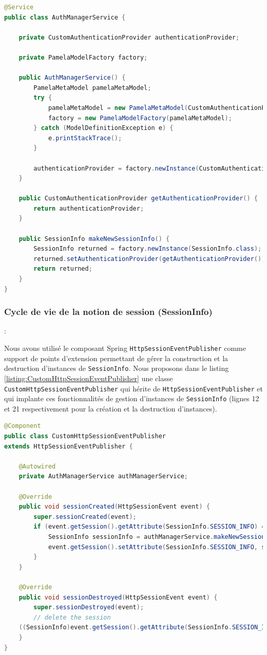 \begin{lstlisting}[language=Java,basicstyle=\ttfamily\footnotesize, caption=Mise en oeuvre du service d'authentification : \texttt{AuthManagerService.java},label=listing:AuthManagerService]
@Service
public class AuthManagerService {

	private CustomAuthenticationProvider authenticationProvider;

	private PamelaModelFactory factory;

	public AuthManagerService() {
		PamelaMetaModel pamelaMetaModel;
		try {
			pamelaMetaModel = new PamelaMetaModel(CustomAuthenticationProvider.class);
			factory = new PamelaModelFactory(pamelaMetaModel);
		} catch (ModelDefinitionException e) {
			e.printStackTrace();
		}

		authenticationProvider = factory.newInstance(CustomAuthenticationProvider.class);
	}

	public CustomAuthenticationProvider getAuthenticationProvider() {
		return authenticationProvider;
	}

	public SessionInfo makeNewSessionInfo() {
		SessionInfo returned = factory.newInstance(SessionInfo.class);
		returned.setAuthenticationProvider(getAuthenticationProvider());
		return returned;
	}
}
\end{lstlisting}

\subsubsection{Cycle de vie de la notion de session (SessionInfo)} : 

Nous avons utilisé le composant Spring \texttt{HttpSessionEventPublisher} comme support de points d'extension permettant de gérer la construction et la destruction d'instances de \texttt{SessionInfo}. Nous proposons dans le listing \ref{listing:CustomHttpSessionEventPublisher} une classe \texttt{CustomHttpSessionEventPublisher} qui hérite de \texttt{HttpSessionEventPublisher} et qui implante ces fonctionnalités de gestion d'instances de \texttt{SessionInfo} (lignes 12 et 21 respectivement pour la création et la destruction d'instances).

\begin{lstlisting}[language=Java,basicstyle=\ttfamily\footnotesize, caption=Cycle de vie des \texttt{SessionInfo} : \texttt{CustomHttpSessionEventPublisher.java},label=listing:CustomHttpSessionEventPublisher]
@Component
public class CustomHttpSessionEventPublisher 
extends HttpSessionEventPublisher {

	@Autowired
	private AuthManagerService authManagerService;

	@Override
	public void sessionCreated(HttpSessionEvent event) {
		super.sessionCreated(event);
		if (event.getSession().getAttribute(SessionInfo.SESSION_INFO) == null) {
			SessionInfo sessionInfo = authManagerService.makeNewSessionInfo();
			event.getSession().setAttribute(SessionInfo.SESSION_INFO, sessionInfo);
		}
	}

	@Override
	public void sessionDestroyed(HttpSessionEvent event) {
		super.sessionDestroyed(event);
		// delete the session
    ((SessionInfo)event.getSession().getAttribute(SessionInfo.SESSION_INFO)).delete();
	}
}
\end{lstlisting}

